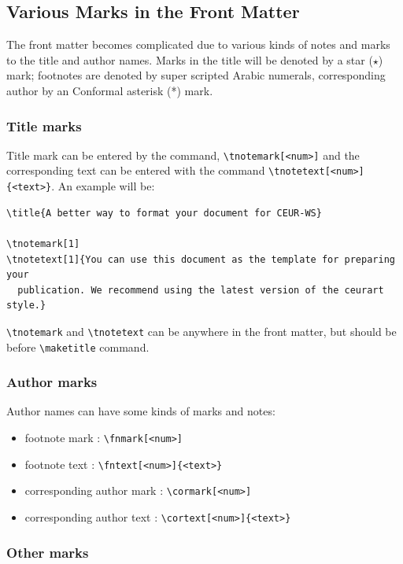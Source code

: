 \documentclass[]{ceurart}
\begin{document}
\subsection{Various Marks in the Front Matter}

The front matter becomes complicated due to various kinds
of notes and marks to the title and author names. Marks in
the title will be denoted by a star ($\star$) mark;
footnotes are denoted by super scripted Arabic numerals,
corresponding author by an Conformal asterisk (*) mark.

\subsubsection{Title marks}

Title mark can be entered by the command, \verb|\tnotemark[<num>]|
and the corresponding text can be entered with the command
\verb|\tnotetext[<num>]{<text>}|. An example will be:

\begin{verbatim}
\title{A better way to format your document for CEUR-WS}

\tnotemark[1]
\tnotetext[1]{You can use this document as the template for preparing your
  publication. We recommend using the latest version of the ceurart style.}
\end{verbatim}

\verb|\tnotemark| and \verb|\tnotetext| can be anywhere in
the front matter, but should be before \verb|\maketitle| command.

\subsubsection{Author marks}

Author names can have some kinds of marks and notes:
\begin{itemize}
\item footnote mark : \verb|\fnmark[<num>]|
\item footnote text : \verb|\fntext[<num>]{<text>}|
\item corresponding author mark : \verb|\cormark[<num>]|
\item corresponding author text : \verb|\cortext[<num>]{<text>}|
\end{itemize}

\subsubsection{Other marks}
\end{document}
